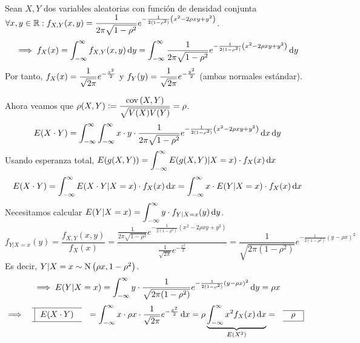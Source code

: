 \begin{ejem}
	Sean $X, Y$ dos variables aleatorias con función de densidad conjunta $\displaystyle \forall x, y \in \mathbb{R} : f_{X, Y}(x, y) = \frac{1}{2\pi \sqrt{1-\rho^2}} e^{-\frac{1}{2(1-\rho^2)}\left(x^2 - 2\rho x y + y^2\right)}$.
	\[\implies f_X(x) = \int_{-\infty}^{\infty} f_{X, Y}(x, y) \odif{y} = \int_{-\infty}^{\infty} \frac{1}{2\pi \sqrt{1-\rho^2}} e^{-\frac{1}{2(1-\rho^2)}\left(x^2 - 2\rho x y + y^2\right)} \odif{y}\]
	Por tanto, $\displaystyle f_X(x) = \frac{1}{\sqrt{2\pi}} e^{-\frac{x^2}{2}}$ y $\displaystyle f_Y(y) = \frac{1}{\sqrt{2\pi}} e^{-\frac{y^2}{2}}$ (ambas normales estándar).

	Ahora veamos que $\displaystyle \rho(X, Y) \vcentcolon= \frac{\operatorname{cov}\left(X, Y\right)}{\sqrt{V(X) V(Y)}} = \rho$.
	\[E(X\cdot Y) = \int_{-\infty}^{\infty} \int_{-\infty}^{\infty} x\cdot y \cdot \frac{1}{2\pi \sqrt{1-\rho^2}} e^{-\frac{1}{2(1-\rho^2)}\left(x^2 - 2\rho x y + y^2\right)} \odif{x} \odif{y}\] %
	Usando esperanza total, $\ds E(g(X, Y)) = \int_{-\infty}^{\infty} E(g(X, Y) \vert X = x) \cdot f_X(x) \odif{x}$
	\[E(X\cdot Y) = \int_{-\infty}^{\infty} E(X\cdot Y \vert X = x) \cdot f_X(x) \odif{x} = \int_{-\infty}^{\infty} x \cdot E(Y \vert X = x) \cdot f_X(x) \odif{x}\]
	Necesitamos calcular $\ds E(Y \vert X = x) = \int_{-\infty}^{\infty} y \cdot f_{Y|X=x}(y) \odif{y}$.
	\[f_{Y|X=x}(y) = \frac{f_{X, Y}(x, y)}{f_X(x)} = \frac{\frac{1}{2\pi \sqrt{1-\rho^2}} e^{-\frac{1}{2(1-\rho^2)}\left(x^2 - 2\rho x y + y^2\right)}}{\frac{1}{\sqrt{2\pi}} e^{-\frac{x^2}{2}}} = \frac{1}{\sqrt{2\pi(1-\rho^2)}} e^{-\frac{1}{2(1-\rho^2)}\left(y-\rho x\right)^2}\]
	Es decir, $Y \vert X = x \sim \operatorname{N}\left(\rho x, 1-\rho^2\right)$.
	\[\implies E(Y \vert X = x) = \int_{-\infty}^{\infty} y \cdot \frac{1}{\sqrt{2\pi(1-\rho^2)}} e^{-\frac{1}{2(1-\rho^2)}\left(y-\rho x\right)^2} \odif{y} = \rho x\]
	\[\implies \lbox{E(X\cdot Y)} = \int_{-\infty}^{\infty} x \cdot \rho x \cdot \frac{1}{\sqrt{2\pi}} e^{-\frac{x^2}{2}} \odif{x} = \rho \underbrace{\int_{-\infty}^{\infty} x^2 f_X(x) \odif{x}}_{E\left(X^2\right)} = \rbox{\rho}\]



\end{ejem}